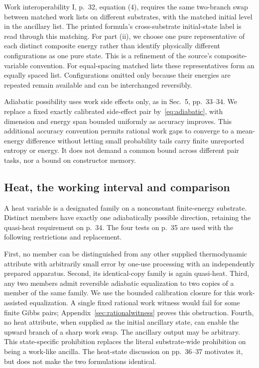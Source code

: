 Work interoperability I, p.~32, equation (4), requires the same two-branch swap between matched work lists on different substrates, with the matched initial level in the ancillary list. The printed formula's cross-substrate initial-state label is read through this matching. For part (ii), we choose one pure representative of each distinct composite energy rather than identify physically different configurations as one pure state. This is a refinement of the source's composite-variable convention. For equal-spacing matched lists these representatives form an equally spaced list. Configurations omitted only because their energies are repeated remain available and can be interchanged reversibly.

Adiabatic possibility uses work side effects only, as in Sec.~5, pp.~33--34. We replace a fixed exactly calibrated side-effect pair by~\eqref{eq:adiabatic}, with dimension and energy span bounded uniformly as accuracy improves. This additional accuracy convention permits rational work gaps to converge to a mean-energy difference without letting small probability tails carry finite unreported entropy or energy. It does not demand a common bound across different pair tasks, nor a bound on constructor memory.

\subsection{Heat, the working interval and comparison}
A heat variable is a designated family on a nonconstant finite-energy substrate. Distinct members have exactly one adiabatically possible direction, retaining the quasi-heat requirement on p.~34. The four tests on p.~35 are used with the following restrictions and replacement.

First, no member can be distinguished from any other supplied thermodynamic attribute with arbitrarily small error by one-use processing with an independently prepared apparatus. Second, its identical-copy family is again quasi-heat. Third, any two members admit reversible adiabatic equalization to two copies of a member of the same family. We use the bounded calibration closure for this work-assisted equalization. A single fixed rational work witness would fail for some finite Gibbs pairs; Appendix~\ref{sec:rationalwitness} proves this obstruction. Fourth, no heat attribute, when supplied as the initial ancillary state, can enable the upward branch of a sharp work swap. The ancillary output may be arbitrary. This state-specific prohibition replaces the literal substrate-wide prohibition on being a work-like ancilla. The heat-state discussion on pp.~36--37 motivates it, but does not make the two formulations identical.

